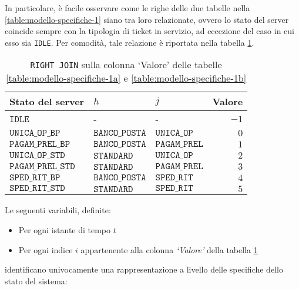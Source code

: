 In particolare, è facile osservare come le righe delle due tabelle nella \ref{table:modello-specifiche-1} siano tra loro relazionate, ovvero lo stato del server coincide sempre con la tipologia di ticket in servizio, ad eccezione del caso in cui esso sia \texttt{IDLE}. Per comodità, tale relazione è riportata nella tabella \ref{table:modello-specifiche-2}.

\begin{table}[ht]
\centering
{\tablecolors
\begin{tabular}{| l || l | l || r |}
\hline
Stato del server & $h$ & $j$ & Valore\\
\hline
$\mathtt{IDLE}$ & - & - & $-1$\\
\hline
$\mathtt{UNICA\_OP\_BP}$ & $\mathtt{BANCO\_POSTA}$ & $\mathtt{UNICA\_OP}$ & $0$\\
\hline
$\mathtt{PAGAM\_PREL\_BP}$ & $\mathtt{BANCO\_POSTA}$ & $\mathtt{PAGAM\_PREL}$ & $1$\\
\hline
$\mathtt{UNICA\_OP\_STD}$ & $\mathtt{STANDARD}$ & $\mathtt{UNICA\_OP}$ & $2$\\
\hline
$\mathtt{PAGAM\_PREL\_STD}$ & $\mathtt{STANDARD}$ & $\mathtt{PAGAM\_PREL}$ & $3$\\
\hline
$\mathtt{SPED\_RIT\_BP}$ & $\mathtt{BANCO\_POSTA}$ & $\mathtt{SPED\_RIT}$ & $4$\\
\hline
$\mathtt{SPED\_RIT\_STD}$ & $\mathtt{STANDARD}$ & $\mathtt{SPED\_RIT}$ & $5$\\
\hline
\end{tabular}}
\caption{\texttt{RIGHT JOIN} sulla colonna `Valore' delle tabelle \ref{table:modello-specifiche-1a} e \ref{table:modello-specifiche-1b}}
\label{table:modello-specifiche-2}
\end{table}

\newpage
Le seguenti variabili, definite:
\begin{itemize}
\item Per ogni istante di tempo $t$
\item Per ogni indice $i$ appartenente alla colonna \textsl{`Valore'} della tabella \ref{table:modello-specifiche-2}
\end{itemize}
identificano univocamente una rappresentazione a livello delle specifiche dello stato del sistema:

